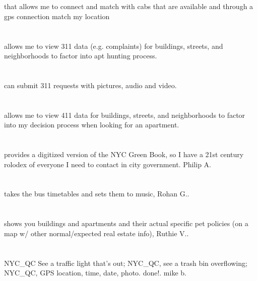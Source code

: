 \section{}    that allows me to connect and match with cabs that are available and through a gps connection match my location 
\section{}allows me to view 311 data (e.g. complaints) for buildings,  streets,  and neighborhoods to factor into apt hunting process. 
\section{}can submit 311 requests with pictures,  audio and video. 
\section{}allows me to view 411 data for buildings,  streets,  and neighborhoods to factor into my decision process when looking for an apartment. 
\section{}provides a digitized version of the NYC Green Book,  so I have a 21st century rolodex of everyone I need to contact in city government. Philip A.
\section{}takes the bus timetables and sets them to music, Rohan G.. \index{}
\section{}shows you buildings and apartments and their actual specific pet policies (on a map w/ other normal/expected real estate info), Ruthie V.. \index{}
\section{}NYC\_QC  See a traffic light that's out; NYC\_QC,  see a trash bin overflowing; NYC\_QC,   GPS location,  time,  date,  photo. done!. mike b.
